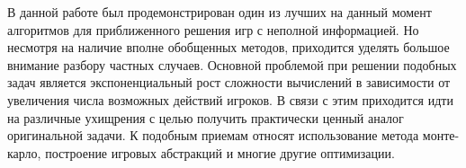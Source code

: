 \Conclusion %
\par
В данной работе был продемонстрирован один из лучших на данный момент алгоритмов для приближенного решения игр с неполной информацией. Но несмотря на наличие вполне обобщенных методов, приходится уделять большое внимание разбору частных случаев. Основной проблемой при решении подобных задач является экспоненциальный рост сложности вычислений в зависимости от увеличения числа возможных действий игроков. В связи с этим приходится идти на различные ухищрения с целью получить практически ценный аналог оригинальной задачи. К подобным приемам относят использование метода монте-карло, построение игровых абстракций и многие другие оптимизации.
